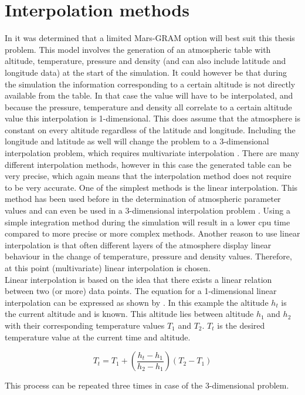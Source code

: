\section{Interpolation methods}
\label{sec:interpol}
In  it was determined that a limited Mars-\ac{GRAM} option will best suit this thesis problem. This model involves the generation of an atmospheric table with altitude, temperature, pressure and density (and can also include latitude and longitude data) at the start of the simulation. It could however be that during the simulation the information corresponding to a certain altitude is not directly available from the table. In that case the value will have to be interpolated, and because the pressure, temperature and density all correlate to a certain altitude value this interpolation is 1-dimensional. This does assume that the atmosphere is constant on every altitude regardless of the latitude and longitude. Including the longitude and latitude as well will change the problem to a 3-dimensional interpolation problem, which requires multivariate interpolation \cite{sagliano2015real}. There are many different interpolation methods, however in this case the generated table can be very precise, which again means that the interpolation method does not require to be very accurate. One of the simplest methods is the linear interpolation. This method has been used before in the determination of atmospheric parameter values \cite{mooij2011passivity} and can even be used in a 3-dimensional interpolation problem \cite{sagliano2015real}. Using a simple integration method during the simulation will result in a lower cpu time compared to more precise or more complex methods. Another reason to use linear interpolation is that often different layers of the atmosphere display linear behaviour in the change of temperature, pressure and density values. Therefore, at this point (multivariate) linear interpolation is chosen. \\
Linear interpolation is based on the idea that there exists a linear relation between two (or more) data points. The equation for a 1-dimensional linear interpolation can be expressed as shown by . In this example the altitude $h_{t}$ is the current altitude and is known. This altitude lies between altitude $h_{1}$ and $h_{2}$ with their corresponding temperature values $T_{1}$ and $T_{2}$. $T_{t}$ is the desired temperature value at the current time and altitude.

\begin{equation} \label{eq:linint}
T_{t}=T_{1}+\left(\dfrac{h_{t}-h_{1}}{h_{2}-h_{1}}\right)\left(T_{2}-T_{1}\right)
\end{equation}  

This process can be repeated three times in case of the 3-dimensional problem. 
